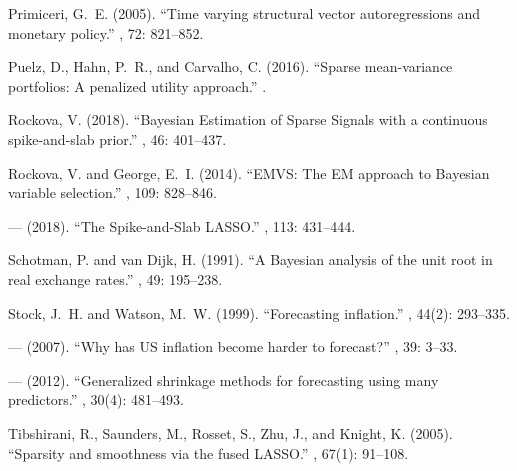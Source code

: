 \documentclass[ba]{imsart}
\numberwithin{equation}{section}
\theoremstyle{plain}
\begin{document}
\begin{thebibliography}{70}
Primiceri, G.~E. (2005).
\newblock \enquote{Time varying structural vector autoregressions and monetary
  policy.}
, 72: 821--852.
\endbibitem

Puelz, D., Hahn, P.~R., and Carvalho, C. (2016).
\newblock \enquote{Sparse mean-variance portfolios: A penalized utility
  approach.}
.
\endbibitem

Rockova, V. (2018).
\newblock \enquote{Bayesian Estimation of Sparse Signals with a continuous
  spike-and-slab prior.}
, 46: 401--437.
\endbibitem

Rockova, V. and George, E.~I. (2014).
\newblock \enquote{{EMVS}: The {EM} approach to {B}ayesian variable selection.}
, 109:
  828--846.
\endbibitem

--- (2018).
\newblock \enquote{The {S}pike-and-{S}lab {LASSO}.}
,
  113: 431--444.
\endbibitem

Schotman, P. and van Dijk, H. (1991).
\newblock \enquote{A Bayesian analysis of the unit root in real exchange
  rates.}
, 49: 195--238.
\endbibitem

Stock, J.~H. and Watson, M.~W. (1999).
\newblock \enquote{Forecasting inflation.}
, 44(2): 293--335.
\endbibitem

--- (2007).
\newblock \enquote{Why has US inflation become harder to forecast?}
, 39: 3--33.
\endbibitem

--- (2012).
\newblock \enquote{Generalized shrinkage methods for forecasting using many
  predictors.}
, 30(4): 481--493.
\endbibitem

Tibshirani, R., Saunders, M., Rosset, S., Zhu, J., and Knight, K. (2005).
\newblock \enquote{{Sparsity and smoothness via the fused LASSO}.}
, 67(1):
  91--108.
\endbibitem


\end{thebibliography}
\end{document}
